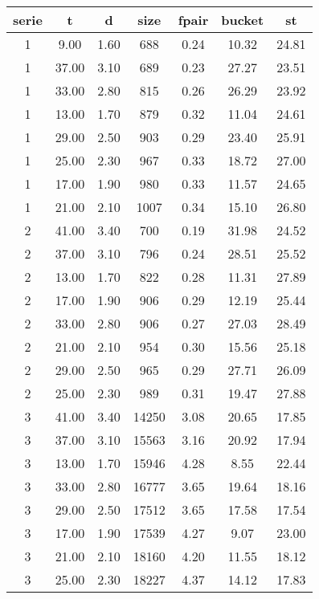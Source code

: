 \begin{tabular}{|c|c|c|c|c|c|c|}
\hline
\textbf{serie} & \textbf{t} & \textbf{d} & \textbf{size} & \textbf{fpair} & \textbf{bucket} & \textbf{st}\\
\hline
1 & 9.00 & 1.60 & 688 & 0.24 & 10.32 & 24.81\\
\hline
1 & 37.00 & 3.10 & 689 & 0.23 & 27.27 & 23.51\\
\hline
1 & 33.00 & 2.80 & 815 & 0.26 & 26.29 & 23.92\\
\hline
1 & 13.00 & 1.70 & 879 & 0.32 & 11.04 & 24.61\\
\hline
1 & 29.00 & 2.50 & 903 & 0.29 & 23.40 & 25.91\\
\hline
1 & 25.00 & 2.30 & 967 & 0.33 & 18.72 & 27.00\\
\hline
1 & 17.00 & 1.90 & 980 & 0.33 & 11.57 & 24.65\\
\hline
1 & 21.00 & 2.10 & 1007 & 0.34 & 15.10 & 26.80\\
\hline
2 & 41.00 & 3.40 & 700 & 0.19 & 31.98 & 24.52\\
\hline
2 & 37.00 & 3.10 & 796 & 0.24 & 28.51 & 25.52\\
\hline
2 & 13.00 & 1.70 & 822 & 0.28 & 11.31 & 27.89\\
\hline
2 & 17.00 & 1.90 & 906 & 0.29 & 12.19 & 25.44\\
\hline
2 & 33.00 & 2.80 & 906 & 0.27 & 27.03 & 28.49\\
\hline
2 & 21.00 & 2.10 & 954 & 0.30 & 15.56 & 25.18\\
\hline
2 & 29.00 & 2.50 & 965 & 0.29 & 27.71 & 26.09\\
\hline
2 & 25.00 & 2.30 & 989 & 0.31 & 19.47 & 27.88\\
\hline
3 & 41.00 & 3.40 & 14250 & 3.08 & 20.65 & 17.85\\
\hline
3 & 37.00 & 3.10 & 15563 & 3.16 & 20.92 & 17.94\\
\hline
3 & 13.00 & 1.70 & 15946 & 4.28 & 8.55 & 22.44\\
\hline
3 & 33.00 & 2.80 & 16777 & 3.65 & 19.64 & 18.16\\
\hline
3 & 29.00 & 2.50 & 17512 & 3.65 & 17.58 & 17.54\\
\hline
3 & 17.00 & 1.90 & 17539 & 4.27 & 9.07 & 23.00\\
\hline
3 & 21.00 & 2.10 & 18160 & 4.20 & 11.55 & 18.12\\
\hline
3 & 25.00 & 2.30 & 18227 & 4.37 & 14.12 & 17.83\\
\hline
\end{tabular}
